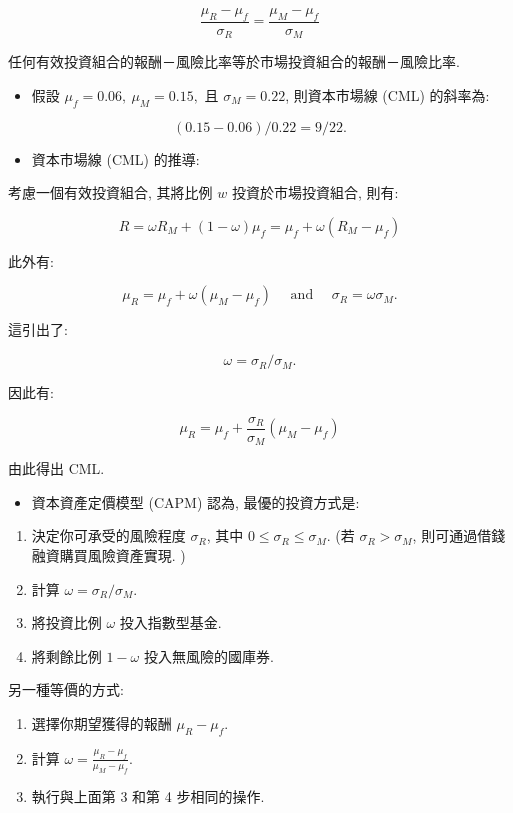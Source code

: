 \documentclass[letterpaper]{article}
\begin{document}
$$
\frac{\mu_{R}-\mu_{f}}{\sigma_{R}}=\frac{\mu_{M}-\mu_{f}}{\sigma_{M}}
$$

任何有效投資組合的報酬－風險比率等於市場投資組合的報酬－風險比率. 

\begin{itemize}
	\item 假設 $\mu_{f} = 0.06, \ \mu_{M} = 0.15, $ 且 $\sigma_{M} = 0.22$, 則資本市場線 (CML) 的斜率為: 
\end{itemize}


$$
 (0.15-0.06) / 0.22=9 / 22 .
$$
\begin{itemize}
	\item 資本市場線 (CML) 的推導: 
\end{itemize}

考慮一個有效投資組合, 其將比例 $w$ 投資於市場投資組合, 則有: 

$$
R=\omega R_{M}+ (1-\omega) \mu_{f}=\mu_{f}+\omega\left (R_{M}-\mu_{f}\right) 
$$

此外有: 

$$
\mu_{R}=\mu_{f}+\omega\left (\mu_{M}-\mu_{f}\right) \quad \text { and } \quad \sigma_{R}=\omega \sigma_{M} .
$$

這引出了: 

$$
\omega=\sigma_{R} / \sigma_{M} .
$$

因此有: 

$$
\mu_{R}=\mu_{f}+\frac{\sigma_{R}}{\sigma_{M}}\left (\mu_{M}-\mu_{f}\right) 
$$

由此得出 CML. 


\begin{itemize}
	\item 資本資產定價模型 (CAPM) 認為, 最優的投資方式是: 
\end{itemize}

\begin{enumerate}
	\item 決定你可承受的風險程度 $\sigma_{R}$, 其中 $0 \leq \sigma_{R} \leq \sigma_{M}$. 
	 (若 $\sigma_{R}>\sigma_{M}$, 則可通過借錢融資購買風險資產實現. ) 
	\item 計算 $\omega=\sigma_{R} / \sigma_{M}$. 
	\item 將投資比例 $\omega$ 投入指數型基金. 
	\item 將剩餘比例 $1-\omega$ 投入無風險的國庫券. 
\end{enumerate}

另一種等價的方式: 

\begin{enumerate}
	\item 選擇你期望獲得的報酬 $\mu_{R}-\mu_{f}$. 
	\item 計算 $\omega=\frac{\mu_{R}-\mu_{f}}{\mu_{M}-\mu_{f}}$. 
	\item 執行與上面第 3 和第 4 步相同的操作. 
\end{enumerate}
\end{document}
